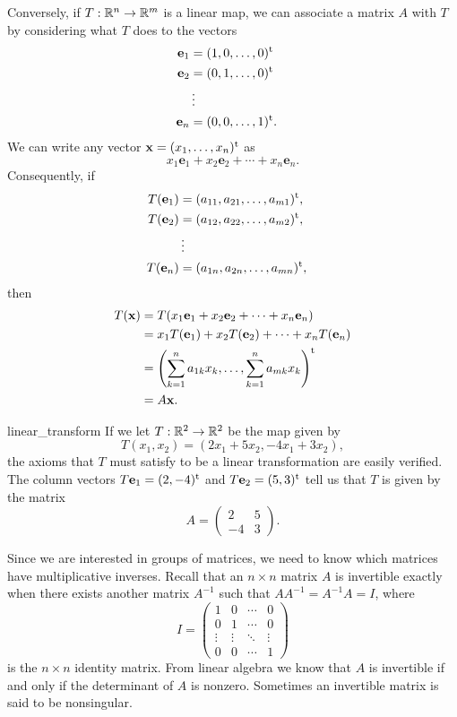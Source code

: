  
Conversely, if $T : {\Bbb R}^n \rightarrow {\Bbb R}^m$ is a linear
map, we can associate a matrix $A$ with $T$ by considering what $T$
does to the vectors 
\begin{align*}
{\mathbf e}_1 & = (1, 0, \ldots, 0)^{\rm t} \\
{\mathbf e}_2 & = (0, 1, \ldots, 0)^{\rm t} \\
            &  \vdots &  \\
{\mathbf e}_n & = (0, 0, \ldots, 1)^{\rm t}.
\end{align*}
We can write any vector ${\mathbf x} = (x_1, \ldots, x_n)^{\rm t}$ as
\[
x_1 {\mathbf e}_1 + x_2 {\mathbf e}_2 + \cdots + x_n {\mathbf e}_n.
\]
Consequently, if
\begin{align*}
T({\mathbf e}_1) & = (a_{11}, a_{21}, \ldots, a_{m1})^{\rm t}, \\
T({\mathbf e}_2) & = (a_{12}, a_{22}, \ldots, a_{m2})^{\rm t}, \\
            &  \vdots &  \\
T({\mathbf e}_n) & = (a_{1n}, a_{2n}, \ldots, a_{mn})^{\rm t},
\end{align*}
then
\begin{align*}
T({\mathbf x} )
& =
T(x_1 {\mathbf e}_1 + x_2 {\mathbf e}_2 + \cdots + x_n {\mathbf e}_n) \\
& =
x_1 T({\mathbf e}_1) + x_2 T({\mathbf e}_2) + \cdots + x_n T({\mathbf e}_n)
\\ 
& =
\left(
\sum_{k=1}^{n} a_{1k} x_k, \ldots,  \sum_{k=1}^{n} a_{mk} x_k
\right)^{\rm t} \\ 
& = 
A {\mathbf x}.
\end{align*}
 
 
\begin{example}{linear_transform}
If we let $T : {\Bbb R}^2 \rightarrow {\Bbb R}^2$ be the map given by 
\[
T(x_1, x_2) = (2 x_1 + 5 x_2, - 4 x_1 + 3 x_2),
\]
the axioms that $T$ must satisfy to be a linear transformation are
easily verified. The column vectors $T {\mathbf e}_1 = (2, -4)^{\rm t}$
and $T {\mathbf e}_2 = (5,3)^{\rm t}$  tell us that $T$ is given by the
matrix 
\[
A =
\begin{pmatrix}
2 & 5 \\
-4 & 3
\end{pmatrix}.
\]
\end{example}
 
 
Since we are interested in groups of matrices, we need to know
which matrices have multiplicative inverses. Recall that an $n \times
n$ matrix $A$ is {\bfi invertible\/} exactly
when there exists another matrix $A^{-1}$ such that $A A^{-1} = A^{-1}
A = I$, where 
\[
I =
\begin{pmatrix}
1 & 0 & \cdots & 0 \\
0 & 1 & \cdots & 0 \\
\vdots & \vdots & \ddots & \vdots \\
0 & 0 & \cdots & 1
\end{pmatrix}
\]
is the $n \times n$ identity matrix. From linear algebra we know that
$A$ is invertible if and only if the determinant of $A$ is nonzero.
Sometimes an invertible matrix is said to be {\bfi
nonsingular}. 
 
